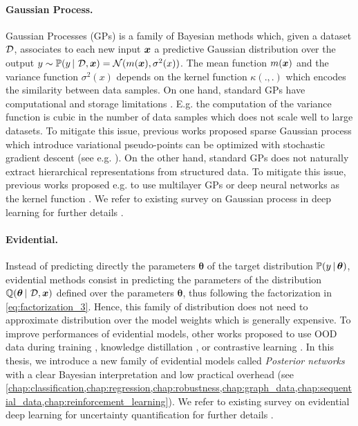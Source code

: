 \paragraph*{Gaussian Process.} Gaussian Processes (GPs) is a family of Bayesian methods which, given a dataset $\operatorname{\mathcal{D}}$, associates to each new input $\bm{x}$ a predictive Gaussian distribution over the output $y \sim \mathbb{P}(y \,|\, \operatorname{\mathcal{D}}, \bm{x}) = \operatorname{\mathcal{N}}(m(\bm{x}), \sigma^2(x))$. The mean function $m(\bm{x})$ and the variance function $\sigma^2(x)$ depends on the kernel function $\kappa(.,.)$ which encodes the similarity between data samples. 
On one hand, standard GPs have computational and storage limitations \cite{jakkala2021deepgp}. E.g. the computation of the variance function is cubic in the number of data samples which does not scale well to large datasets. To mitigate this issue, previous works proposed sparse Gaussian process which introduce variational pseudo-points can be optimized with stochastic gradient descent (see e.g. \cite{snelson2005sparse,titsias2010gplvm,due}).
On the other hand, standard GPs does not naturally extract hierarchical representations from structured data. To mitigate this issue, previous works proposed e.g. to use multilayer GPs \cite{damianou2012deepgp} or deep neural networks as the kernel function \cite{wilson2016stochastic}. We refer to existing survey on Gaussian process in deep learning for further details \citep{gp-for-ml,damianou2012deepgp,jakkala2021deepgp}.

\paragraph*{Evidential.} Instead of predicting directly the parameters $\bm{\theta}$ of the target distribution $\mathbb{P}(y \,|\, \bm{\theta})$, evidential methods consist in predicting the parameters of the distribution $\operatorname{\mathbb{Q}}(\bm{\theta} \,|\, \operatorname{\mathcal{D}}, \bm{x})$ defined over the parameters $\bm{\theta}$, thus following the factorization in \cref{eq:factorization_3}. Hence, this family of distribution does not need to approximate distribution over the model weights which is generally expensive. To improve performances of evidential models, other works proposed to use OOD data during training \cite{PriorNetworks,reverse-kl}, knowledge distillation \cite{distribution-distillation}, or contrastive learning \cite{uncertainty-generative-classifier}. In this thesis, we introduce a new family of evidential models called \emph{Posterior networks} with a clear Bayesian interpretation and low practical overhead (see \cref{chap:classification,chap:regression,chap:robustness,chap:graph_data,chap:sequential_data,chap:reinforcement_learning}). We refer to existing survey on evidential deep learning for uncertainty quantification for further details \citep{survey_evidential_uncertainty}.

